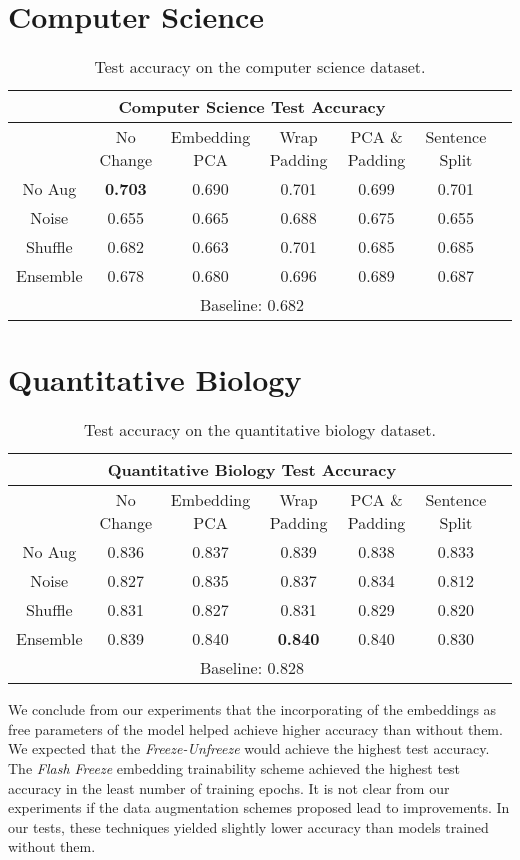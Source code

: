 \section{Computer Science}
\begin{center}
  \begin{table}[H]
 \begin{tabular}{|c||c|c|c|c|c|c|}
  \hline
  \multicolumn{6}{|c|}{\textbf{Computer Science Test Accuracy}}\\ \hline
   & No Change & Embedding PCA & Wrap Padding & PCA \& Padding & Sentence Split\\  \hline
   No Aug & \textbf{0.703} & 0.690 & 0.701 & 0.699 & 0.701 \\      \hline
   Noise & 0.655 & 0.665 & 0.688 & 0.675 &  0.655 \\      \hline
   Shuffle & 0.682 & 0.663 & 0.701 & 0.685 & 0.685 \\  \hline
   Ensemble & 0.678 & 0.680 & 0.696 & 0.689 & 0.687 \\      \hline
   \multicolumn{6}{|c|}{Baseline: 0.682}\\ \hline
 \end{tabular}
 \caption{Test accuracy on the computer science dataset.}
 \end{table}
\end{center}

\section{Quantitative Biology}
\begin{center}
  \begin{table}[H]
\begin{tabular}{|c||c|c|c|c|c|c|}
  \hline
\multicolumn{6}{|c|}{\textbf{Quantitative Biology Test Accuracy}}\\ \hline
  & No Change & Embedding PCA & Wrap Padding & PCA \& Padding & Sentence Split\\  \hline
  No Aug & 0.836 & 0.837 & 0.839 & 0.838 & 0.833 \\      \hline
  Noise & 0.827 & 0.835 & 0.837 & 0.834 & 0.812  \\      \hline
  Shuffle & 0.831 & 0.827 & 0.831 & 0.829 & 0.820 \\      \hline
  Ensemble & 0.839 & 0.840 & \textbf{0.840} & 0.840 & 0.830 \\      \hline
  \multicolumn{6}{|c|}{Baseline: 0.828}\\ \hline
\end{tabular}
\caption{Test accuracy on the quantitative biology dataset.}
\end{table}
\end{center}

We conclude from our experiments that the incorporating of the embeddings as free parameters of the model helped achieve higher accuracy than without them.
We expected that the \textit{Freeze-Unfreeze} would achieve the highest test accuracy. The \textit{Flash Freeze} embedding trainability scheme achieved the
highest test accuracy in the least number of training epochs. It is not clear from our experiments if the data augmentation schemes proposed lead to improvements. In our tests, these techniques yielded slightly lower
accuracy than models trained without them.
